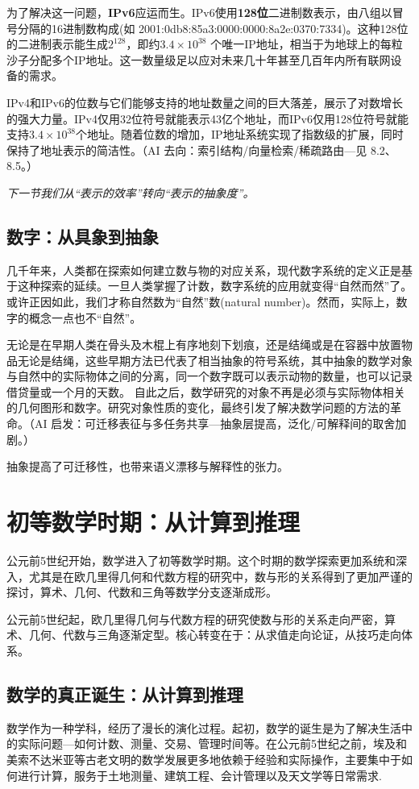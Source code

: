    为了解决这一问题，{\bf IPv6}应运而生。IPv6使用{\bf 128位}二进制数表示，由八组以冒号分隔的16进制数构成(如 2001:0db8:85a3:0000:0000:8a2e:0370:7334)。这种128位的二进制表示能生成$2^{128}$，即约{\bf $3.4 \times 10^{38} $} 个唯一IP地址，相当于为地球上的每粒沙子分配多个IP地址。这一数量级足以应对未来几十年甚至几百年内所有联网设备的需求。
   
IPv4和IPv6的位数与它们能够支持的地址数量之间的巨大落差，展示了对数增长的强大力量。IPv4仅用32位符号就能表示43亿个地址，而IPv6仅用128位符号就能支持{\bf $3.4 \times 10^{38}$}个地址。随着位数的增加，IP地址系统实现了指数级的扩展，同时保持了地址表示的简洁性。{（AI 去向：索引结构/向量检索/稀疏路由—见 8.2、8.5。）}

\emph{下一节我们从“表示的效率”转向“表示的抽象度”。}

\subsection{数字：从具象到抽象}
几千年来，人类都在探索如何建立数与物的对应关系，现代数字系统的定义正是基于这种探索的延续。一旦人类掌握了计数，数字系统的应用就变得“自然而然”了。或许正因如此，我们才称自然数为“自然”数(natural number)。然而，实际上，数字的概念一点也不“自然”。

无论是在早期人类在骨头及木棍上有序地刻下划痕，还是结绳或是在容器中放置物品无论是结绳，这些早期方法已代表了相当抽象的符号系统，其中抽象的数学对象与自然中的实际物体之间的分离，同一个数字既可以表示动物的数量，也可以记录借贷量或一个月的天数。
自此之后，数学研究的对象不再是必须与实际物体相关的几何图形和数字。研究对象性质的变化，最终引发了解决数学问题的方法的革命。{（AI 启发：可迁移表征与多任务共享—抽象层提高，泛化/可解释间的取舍加剧。）}

抽象提高了可迁移性，也带来语义漂移与解释性的张力。

\section{初等数学时期：从计算到推理}
公元前5世纪开始，数学进入了初等数学时期。这个时期的数学探索更加系统和深入，尤其是在欧几里得几何和代数方程的研究中，数与形的关系得到了更加严谨的探讨，算术、几何、代数和三角等数学分支逐渐成形。

公元前5世纪起，欧几里得几何与代数方程的研究使数与形的关系走向严密，算术、几何、代数与三角逐渐定型。核心转变在于：从求值走向论证，从技巧走向体系。

\subsection{数学的真正诞生：从计算到推理}
数学作为一种学科，经历了漫长的演化过程。起初，数学的诞生是为了解决生活中的实际问题---如何计数、测量、交易、管理时间等。在公元前5世纪之前，埃及和美索不达米亚等古老文明的数学发展更多地依赖于经验和实际操作，主要集中于如何进行计算，服务于土地测量、建筑工程、会计管理以及天文学等日常需求.

